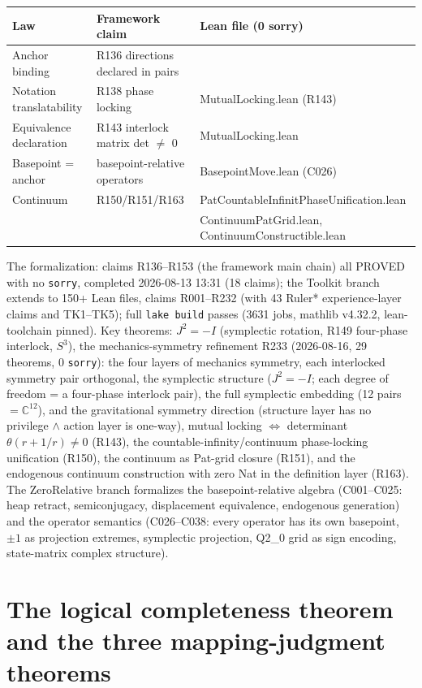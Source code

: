 \documentclass[sigplan,10pt,anonymous,review]{acmart}
\begin{document}
\begin{center}
\begin{tabular}{lll}
\toprule
Law & Framework claim & Lean file (0 sorry) \\
\midrule
Anchor binding & R136 directions declared in pairs & \\
Notation translatability & R138 phase locking & MutualLocking.lean (R143) \\
Equivalence declaration & R143 interlock matrix det $\neq$ 0 & MutualLocking.lean \\
Basepoint = anchor & basepoint-relative operators & BasepointMove.lean (C026) \\
Continuum & R150/R151/R163 & PatCountableInfinitPhaseUnification.lean \\
 & & ContinuumPatGrid.lean, ContinuumConstructible.lean \\
\bottomrule
\end{tabular}
\end{center}

The formalization: claims R136--R153 (the framework main chain) all PROVED
with no \texttt{sorry}, completed 2026-08-13 13:31 (18 claims); the Toolkit
branch extends to 150+ Lean files, claims R001--R232 (with 43 Ruler*
experience-layer claims and TK1--TK5); full \texttt{lake build} passes
(3631 jobs, mathlib v4.32.2, lean-toolchain pinned). Key theorems:
$J^2 = -I$ (symplectic rotation, R149 four-phase interlock, $S^3$),
the mechanics-symmetry refinement R233 (2026-08-16, 29 theorems, 0
\texttt{sorry}): the four layers of mechanics symmetry, each interlocked
symmetry pair orthogonal, the symplectic structure ($J^2=-I$; each degree
of freedom = a four-phase interlock pair), the full symplectic embedding
(12 pairs $= \mathbb C^{12}$), and the gravitational symmetry direction
(structure layer has no privilege $\wedge$ action layer is one-way),
mutual locking $\iff$ determinant $\theta(r+1/r) \neq 0$ (R143), the
countable-infinity/continuum phase-locking unification (R150), the continuum
as Pat-grid closure (R151), and the endogenous continuum construction with
zero Nat in the definition layer (R163). The ZeroRelative branch formalizes
the basepoint-relative algebra (C001--C025: heap retract, semiconjugacy,
displacement equivalence, endogenous generation) and the operator semantics
(C026--C038: every operator has its own basepoint, $\pm1$ as projection
extremes, symplectic projection, Q2\_0 grid as sign encoding, state-matrix
complex structure).

\section{The logical completeness theorem and the three mapping-judgment theorems}
\end{document}
